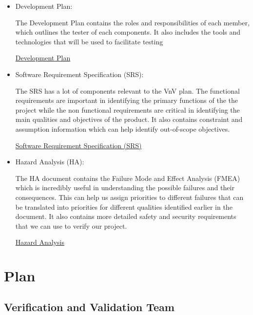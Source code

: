\documentclass[12pt, titlepage]{article}
\begin{document}
\begin{itemize}
	\item Development Plan:

	The Development Plan contains the roles and responsibilities of each member, which outlines the tester of each components. It also includes the tools and technologies that will be used to facilitate testing

	\href{https://github.com/beatlepie/4G06CapstoneProjectTeam2/blob/docs-VnV-plan/docs/DevelopmentPlan/DevelopmentPlan.pdf}{Development Plan}
    \item Software Requirement Specification (SRS):
          
          The SRS has a lot of components relevant to the VnV plan. The functional requirements are important in identifying the primary functions of the the project while the non functional requirements are critical in identifying the main qualities and objectives of the product. It also contains constraint and assumption information which can help identify out-of-scope objectives.

          \href{https://github.com/beatlepie/4G06CapstoneProjectTeam2/blob/docs-VnV-plan/docs/SRS-Volere/SRS.pdf}{Software Requirement Specification (SRS)}
    \item Hazard Analysis (HA):
    
        The HA document contains the Failure Mode and Effect Analysis (FMEA) which is incredibly useful in understanding the possible failures and their consequences. This can help us assign priorities to different failures that can be translated into priorities for different qualities identified earlier in the document. It also contains more detailed safety and security requirements that we can use to verify our project.

        \href{https://github.com/beatlepie/4G06CapstoneProjectTeam2/blob/docs-VnV-plan/docs/HazardAnalysis/HazardAnalysis.pdf}{Hazard Analysis}
\end{itemize}


\section{Plan}


\subsection{Verification and Validation Team}
\end{document}
